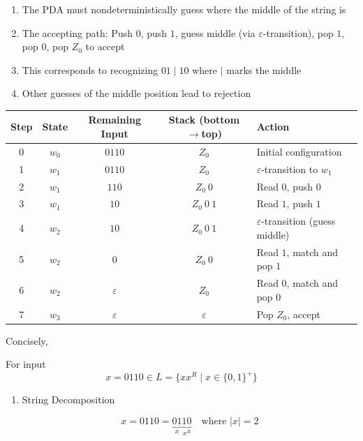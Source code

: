 \documentclass[12pt,a4paper,openany]{article}
\begin{document}
\begin{enumerate}
\begin{center}
{\begin{tikzpicture}
\end{tikzpicture}
}
\end{center}


\begin{enumerate}
    \item The PDA must nondeterministically guess where the middle of the string is
    \item The accepting path: Push $0$, push $1$, guess middle (via $\varepsilon$-transition), pop $1$, pop $0$, pop $Z_0$ to accept
    \item This corresponds to recognizing $01 \mid 10$ where $\mid$ marks the middle
    \item Other guesses of the middle position lead to rejection
\end{enumerate}

\begin{table}[h]
\centering
\begin{tabular}{|c|c|c|c|l|}
\hline
\textbf{Step} & \textbf{State} & \textbf{Remaining Input} & \textbf{Stack (bottom$\to$top)} & \textbf{Action} \\
\hline
0 & $w_0$ & $0110$ & $Z_0$ & Initial configuration \\
\hline
1 & $w_1$ & $0110$ & $Z_0$ & $\varepsilon$-transition to $w_1$ \\
\hline
2 & $w_1$ & $110$ & $Z_0\ 0$ & Read $0$, push $0$ \\
\hline
3 & $w_1$ & $10$ & $Z_0\ 0\ 1$ & Read $1$, push $1$ \\
\hline
4 & $w_2$ & $10$ & $Z_0\ 0\ 1$ & $\varepsilon$-transition (guess middle) \\
\hline
5 & $w_2$ & $0$ & $Z_0\ 0$ & Read $1$, match and pop $1$ \\
\hline
6 & $w_2$ & $\varepsilon$ & $Z_0$ & Read $0$, match and pop $0$ \\
\hline
7 & $w_3$ & $\varepsilon$ & $\varepsilon$ & Pop $Z_0$, accept \\
\hline
\end{tabular}
\end{table}

Concisely,

For input \[x = 0110 \in L = \{xx^R \mid x \in \{0,1\}^+\}\]

\begin{enumerate}

\item String Decomposition

\[
x = 0110 = \underbrace{01}_x \underbrace{10}_{x^R} \quad \text{where } |x| = 2
\]


\end{enumerate}
\end{enumerate}
\end{document}
